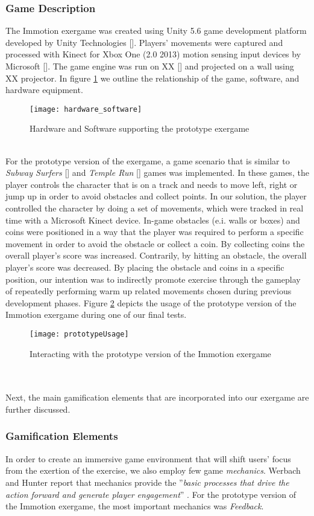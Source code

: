 \subsubsection{Game Description}
The Immotion exergame was created using Unity 5.6 game development platform developed by Unity Technologies []. Players' movements were captured and processed with Kinect for Xbox One (2.0 2013) motion sensing input devices by Microsoft []. The game engine was run on XX [] and projected on a wall using XX projector. In figure \ref{fig:hs} we outline the relationship of the game, software, and hardware equipment.\\
\begin{figure}[h]
    \centering
    \texttt{[image: hardware\_software]}
    \caption{Hardware and Software supporting the prototype exergame}
    \label{fig:hs}
\end{figure}\\
For the prototype version of the exergame, a game scenario that is similar to \textit{Subway Surfers} [] and \textit{Temple Run} [] games was implemented. In these games, the player controls the character that is on a track and needs to move left, right or jump up in order to avoid obstacles and collect points. In our solution, the player controlled the character by doing a set of movements, which were tracked in real time with a Microsoft Kinect device. In-game obstacles (e.i. walls or boxes) and coins were positioned in a way that the player was required to perform a specific movement in order to avoid the obstacle or collect a coin. By collecting coins the overall player's score was increased. Contrarily, by hitting an obstacle, the overall player's score was decreased. By placing the obstacle and coins in a specific position, our intention was to indirectly promote exercise through the gameplay of repeatedly performing warm up related movements chosen during previous development phases. Figure \ref{fig:prototypeUsage} depicts the usage of the prototype version of the Immotion exergame during one of our final tests.
\begin{figure}[h]
    \centering
    \texttt{[image: prototypeUsage]}
    \caption{Interacting with the prototype version of the Immotion exergame}
    \label{fig:prototypeUsage}
\end{figure}\\ \\
Next, the main gamification elements that are incorporated into our exergame are further discussed.
\subsubsection{Gamification Elements}
In order to create an immersive game environment that will shift users' focus from the exertion of the exercise, we also employ few game \textit{mechanics}.  Werbach and Hunter report that mechanics provide the ''\textit{basic processes that drive the action forward and generate
player engagement}'' \cite{werbach2012win}. For the prototype version of the Immotion exergame, the most important mechanics was \textit{Feedback}.


